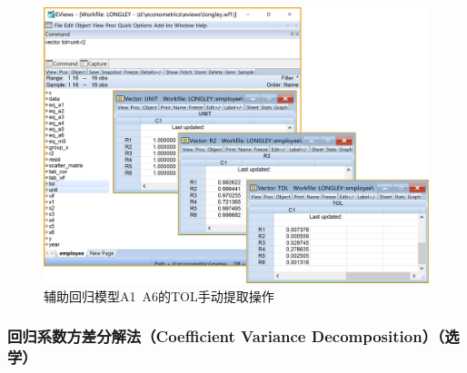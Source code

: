 \documentclass[12pt,(landscape,a4paper),(portrait,a4paper)]{article}
\begin{document}
\begin{figure}

{\centering \includegraphics[width=8in]{picture/lab5-multilinearity/3-vector-TOL} 

}

\caption{辅助回归模型A1~A6的TOL手动提取操作}\label{fig:fig-TOL}
\end{figure}

\hypertarget{coefficient-variance-decomposition}{%
\subsubsection{回归系数方差分解法（Coefficient Variance
Decomposition）（选学）}\label{coefficient-variance-decomposition}}
\end{document}
